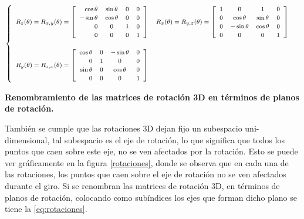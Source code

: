 \begin{equation}
\label{eq:rotaciones}
\footnotesize{
   \begin{cases}
   \begin{array}{rccl}
    
    R_z(\theta) = R_{x,y}(\theta)
    =
    \left[
    \begin{array}{rccl}
    \cos\theta & \sin\theta & 0 & 0\\
    -\sin\theta & \cos\theta & 0  &  0\\
    0 & 0 & 1 & 0 \\
    0 & 0 & 0 & 1\\
    \end{array}
    \right]
   
    &
    R_x(\theta) = R_{y,z}(\theta)
    =
    \left[
    \begin{array}{rccl}
    1 & 0 & 1 & 0\\
    0 & \cos\theta & \sin\theta &  0\\
    0 & -\sin\theta & \cos\theta & 0 \\
    0 & 0 & 0 & 1\\
    \end{array}
    \right]
    \\ \\
    R_y(\theta) = R_{z,x}(\theta)
    =
    \left[
    \begin{array}{rccl}
    \cos\theta & 0 & -\sin\theta & 0\\
    0 & 1 & 0 &  0\\
    \sin\theta & 0 & \cos\theta & 0 \\
    0 & 0 & 0 & 1\\
    \end{array}
    \right]
    
    \end{array}
\end{cases}
}
\end{equation}


\begin{center}
\caption{\footnotesize{\textbf{Renombramiento de las matrices de rotación 3D en términos de planos de rotación.}}}
\end{center}
    
También se cumple que las rotaciones 3D dejan fijo un subespacio uni-dimensional, tal subespacio es el eje de rotación, lo que significa que todos los puntos que 
caen sobre este eje, no se ven afectados por la rotación. Esto se puede ver gráficamente en la figura \ref{rotaciones}, donde se observa que en cada una 
de las rotaciones, los puntos que caen sobre el eje de rotación no se ven afectados durante el giro. Si se renombran las matrices de rotación 3D, en términos de planos de rotación, colocando como subíndices los ejes que forman dicho plano se tiene la \ref{eq:rotaciones}.

